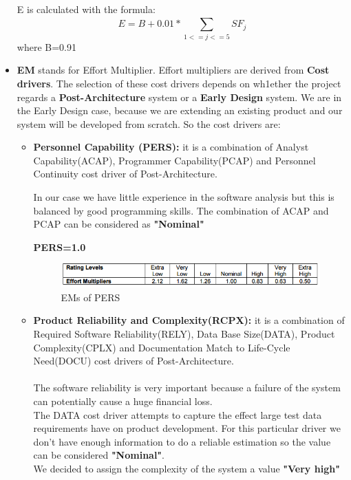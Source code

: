 \begin{itemize}
	E is calculated with the formula:
	\begin{equation}
	E = B + 0.01 * \sum_{1<=j<=5}^{} SF_{j}
	\end{equation}
	where B=0.91
	
	\item\textbf{EM} stands for Effort Multiplier. Effort multipliers are derived from \textbf{Cost drivers}. The selection of these cost drivers depends on wh1ether the project regards a \textbf{Post-Architecture} system or a \textbf{Early Design} system. We are in the Early Design case, because we are extending an existing product and our system will be developed from scratch. So the cost drivers are:
	\begin{itemize}[label = {-}]
		\item {\textbf{Personnel Capability (PERS):} it is a combination of Analyst Capability(ACAP), Programmer Capability(PCAP) and Personnel Continuity cost driver of Post-Architecture.

			In our case we have little experience in the software analysis but this is balanced by good programming skills. The combination of ACAP and PCAP can be considered as \textbf{"Nominal"}
			
			\textbf{PERS=1.0}
\begin{figure}[H] 
	\centering
	\includegraphics[scale = 0.6]{img/PERS.png}
	\caption{EMs of PERS}
\end{figure}
		
		}
		\item {\textbf{Product Reliability and Complexity(RCPX):} it is a combination of Required Software Reliability(RELY), Data Base Size(DATA), Product Complexity(CPLX) and Documentation Match to Life-Cycle Need(DOCU) cost drivers of Post-Architecture. 
			\\
			\\
			The software reliability is very important because a failure of the system can potentially cause a huge financial loss.\\
			The DATA cost driver attempts to capture the effect large test data requirements have on product development. For this particular driver we don’t have enough information to do a reliable estimation so the value can be considered \textbf{"Nominal"}.\\
			We decided to assign the complexity of the system a value \textbf{"Very high"}
			
}
\end{itemize}
\end{itemize}
